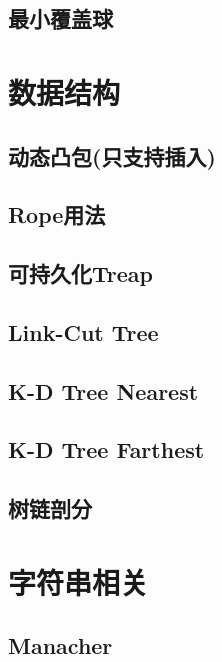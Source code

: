 \documentclass[10pt]{article}
\begin{document}
	\subsection{最小覆盖球}
		

\section{数据结构}
	\subsection{动态凸包(只支持插入)}
		
		
	\subsection{Rope用法}
		
	
	\subsection{可持久化Treap}
		
	
	\subsection{Link-Cut Tree}
		

	\subsection{K-D Tree Nearest}
		

	\subsection{K-D Tree Farthest}
		

	\subsection{树链剖分}
		

\section{字符串相关}
	\subsection{Manacher}
		
\end{document}
